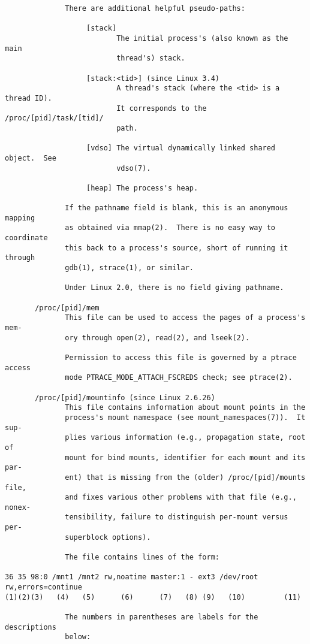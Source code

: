\documentclass[]{article}
\begin{document}
\begin{verbatim}
              There are additional helpful pseudo-paths:

                   [stack]
                          The initial process's (also known as the main
                          thread's) stack.

                   [stack:<tid>] (since Linux 3.4)
                          A thread's stack (where the <tid> is a thread ID).
                          It corresponds to the /proc/[pid]/task/[tid]/
                          path.

                   [vdso] The virtual dynamically linked shared object.  See
                          vdso(7).

                   [heap] The process's heap.

              If the pathname field is blank, this is an anonymous mapping
              as obtained via mmap(2).  There is no easy way to coordinate
              this back to a process's source, short of running it through
              gdb(1), strace(1), or similar.

              Under Linux 2.0, there is no field giving pathname.

       /proc/[pid]/mem
              This file can be used to access the pages of a process's mem‐
              ory through open(2), read(2), and lseek(2).

              Permission to access this file is governed by a ptrace access
              mode PTRACE_MODE_ATTACH_FSCREDS check; see ptrace(2).

       /proc/[pid]/mountinfo (since Linux 2.6.26)
              This file contains information about mount points in the
              process's mount namespace (see mount_namespaces(7)).  It sup‐
              plies various information (e.g., propagation state, root of
              mount for bind mounts, identifier for each mount and its par‐
              ent) that is missing from the (older) /proc/[pid]/mounts file,
              and fixes various other problems with that file (e.g., nonex‐
              tensibility, failure to distinguish per-mount versus per-
              superblock options).

              The file contains lines of the form:

36 35 98:0 /mnt1 /mnt2 rw,noatime master:1 - ext3 /dev/root rw,errors=continue
(1)(2)(3)   (4)   (5)      (6)      (7)   (8) (9)   (10)         (11)

              The numbers in parentheses are labels for the descriptions
              below:


\end{verbatim}
\end{document}

